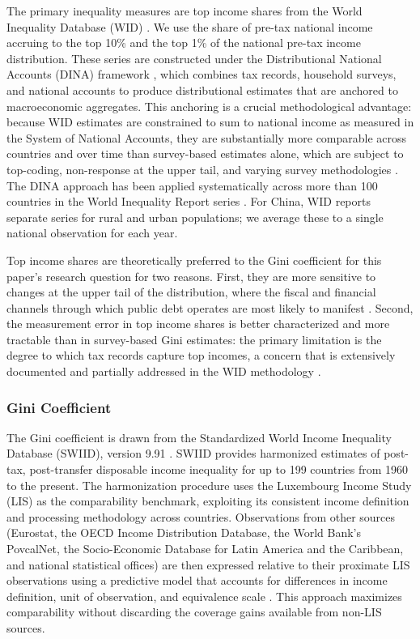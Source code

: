 \documentclass[12pt, titlepage]{article}
\numberwithin{equation}{section}
\begin{document}
The primary inequality measures are top income shares from the World
Inequality Database (WID) \citep{WID2024}. We use the share of pre-tax national
income accruing to the top 10\% and the top 1\% of the national pre-tax
income distribution. These series are constructed under the Distributional
National Accounts (DINA) framework \citep{BlanchetEtAlDINA2021}, which
combines tax records, household surveys, and national accounts to produce
distributional estimates that are anchored to macroeconomic aggregates. This
anchoring is a crucial methodological advantage: because WID estimates are
constrained to sum to national income as measured in the System of National
Accounts, they are substantially more comparable across countries and over
time than survey-based estimates alone, which are subject to top-coding,
non-response at the upper tail, and varying survey methodologies
\citep{AtkinsonPiketty2007}. The DINA approach has been applied
systematically across more than 100 countries in the World Inequality Report
series \citep{ChandelEtAlWIR2022}. For China, WID reports separate series for
rural and urban populations; we average these to a single national
observation for each year.

Top income shares are theoretically preferred to the Gini coefficient for
this paper's research question for two reasons. First, they are more
sensitive to changes at the upper tail of the distribution, where the fiscal
and financial channels through which public debt operates are most likely to
manifest \citep{PikettyS2003, Atkinson2011}. Second, the measurement error in
top income shares is better characterized and more tractable than in
survey-based Gini estimates: the primary limitation is the degree to which
tax records capture top incomes, a concern that is extensively documented and
partially addressed in the WID methodology \citep{AlvaradoEtAl2013}.

\subsubsection{Gini Coefficient}

The Gini coefficient is drawn from the Standardized World Income Inequality
Database (SWIID), version 9.91 \citep{solt2020}. SWIID provides harmonized estimates
of post-tax, post-transfer disposable income inequality for up to 199
countries from 1960 to the present. The harmonization procedure uses the
Luxembourg Income Study (LIS) as the comparability benchmark, exploiting its
consistent income definition and processing methodology across countries.
Observations from other sources (Eurostat, the OECD Income Distribution
Database, the World Bank's PovcalNet, the Socio-Economic Database for Latin
America and the Caribbean, and national statistical offices) are then
expressed relative to their proximate LIS observations using a predictive
model that accounts for differences in income definition, unit of
observation, and equivalence scale \citep{solt2020}. This approach maximizes
comparability without discarding the coverage gains available from non-LIS
sources.
\end{document}
